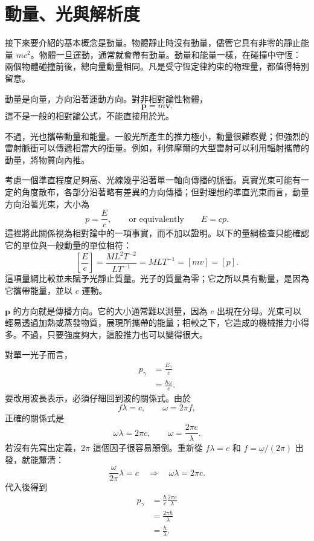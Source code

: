 \section{動量、光與解析度}

接下來要介紹的基本概念是動量。物體靜止時沒有動量，儘管它具有非零的靜止能量 \(mc^2\)。物體一旦運動，通常就會帶有動量。動量和能量一樣，在碰撞中守恆：兩個物體碰撞前後，總向量動量相同。凡是受守恆定律約束的物理量，都值得特別留意。

動量是向量，方向沿著運動方向。對非相對論性物體，
\begin{equation}
\mathbf p=m\mathbf v.
\end{equation}
這不是一般的相對論公式，不能直接用於光。

不過，光也攜帶動量和能量。一般光所產生的推力極小，動量很難察覺；但強烈的雷射脈衝可以傳遞相當大的衝量。例如，利佛摩爾的大型雷射可以利用輻射攜帶的動量，將物質向內推。

考慮一個準直程度足夠高、光線幾乎沿著單一軸向傳播的脈衝。真實光束可能有一定的角度散布，各部分沿著略有差異的方向傳播；但對理想的準直光束而言，動量方向沿著光束，大小為
\begin{equation}
p=\frac{E}{c},
\qquad\text{or equivalently}\qquad
E=cp.
\end{equation}
這裡將此關係視為相對論中的一項事實，而不加以證明。以下的量綱檢查只能確認它的單位與一般動量的單位相符：
\begin{equation}
\left[\frac{E}{c}\right]
=
\frac{M L^2 T^{-2}}{L T^{-1}}
=
M L T^{-1}
=
[m v]
=
[p].
\end{equation}
這項量綱比較並未賦予光靜止質量。光子的質量為零；它之所以具有動量，是因為它攜帶能量，並以 \(c\) 運動。

\(\mathbf p\) 的方向就是傳播方向。它的大小通常難以測量，因為 \(c\) 出現在分母。光束可以輕易透過加熱或蒸發物質，展現所攜帶的能量；相較之下，它造成的機械推力小得多。不過，只要強度夠大，這股推力也可以變得很大。

對單一光子而言，
\begin{align}
p_\gamma
&=\frac{E_\gamma}{c}\\
&=\frac{\hbar\omega}{c}.
\end{align}
要改用波長表示，必須仔細回到波的關係式。由於
\begin{equation}
f\lambda=c,
\qquad
\omega=2\pi f,
\end{equation}
正確的關係式是
\begin{equation}
\omega\lambda=2\pi c,
\qquad
\omega=\frac{2\pi c}{\lambda}.
\end{equation}
若沒有先寫出定義，\(2\pi\) 這個因子很容易顛倒。重新從 \(f\lambda=c\) 和 \(f=\omega/(2\pi)\) 出發，就能釐清：
\begin{equation}
\frac{\omega}{2\pi}\lambda=c
\quad\Longrightarrow\quad
\omega\lambda=2\pi c.
\end{equation}
代入後得到
\begin{align}
p_\gamma
&=\frac{\hbar}{c}\frac{2\pi c}{\lambda}\\
&=\frac{2\pi\hbar}{\lambda}\\
&=\frac{h}{\lambda}.
\end{align}

